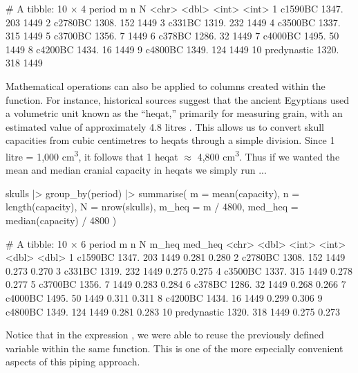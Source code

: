 \begin{outR}
# A tibble: 10 × 4
   period          m     n     N
   <chr>       <dbl> <int> <int>
 1 c1590BC     1347.   203  1449
 2 c2780BC     1308.   152  1449
 3 c331BC      1319.   232  1449
 4 c3500BC     1337.   315  1449
 5 c3700BC     1356.     7  1449
 6 c378BC      1286.    32  1449
 7 c4000BC     1495.    50  1449
 8 c4200BC     1434.    16  1449
 9 c4800BC     1349.   124  1449
10 predynastic 1320.   318  1449
\end{outR}

Mathematical operations can also be applied to columns created within the  function. For instance, historical sources suggest that the ancient Egyptians used a volumetric unit known as the ``heqat,'' primarily for measuring grain, with an estimated value of approximately 4.8 litres \parencite{Clagett1989}. This allows us to convert skull capacities from cubic centimetres to heqats through a simple division. Since 1 litre = 1,000 cm\textsuperscript{3}, it follows that 1 heqat $\approx$ 4,800 cm\textsuperscript{3}. Thus if we wanted the mean and median cranial capacity in heqats we simply run ...

\begin{inR}
skulls |>
  group_by(period) |>
  summarise(
    m = mean(capacity),
    n = length(capacity),
    N = nrow(skulls),
    m_heq = m / 4800,
    med_heq = median(capacity) / 4800
  )
\end{inR}

\clearpage

\begin{outR}
# A tibble: 10 × 6
   period          m     n     N m_heq med_heq
   <chr>       <dbl> <int> <int> <dbl>   <dbl>
 1 c1590BC     1347.   203  1449 0.281   0.280
 2 c2780BC     1308.   152  1449 0.273   0.270
 3 c331BC      1319.   232  1449 0.275   0.275
 4 c3500BC     1337.   315  1449 0.278   0.277
 5 c3700BC     1356.     7  1449 0.283   0.284
 6 c378BC      1286.    32  1449 0.268   0.266
 7 c4000BC     1495.    50  1449 0.311   0.311
 8 c4200BC     1434.    16  1449 0.299   0.306
 9 c4800BC     1349.   124  1449 0.281   0.283
10 predynastic 1320.   318  1449 0.275   0.273
\end{outR}

\noindent
Notice that in the expression , we were able to reuse the previously defined variable  within the same  function. This is one of the more especially convenient aspects of this piping approach.

